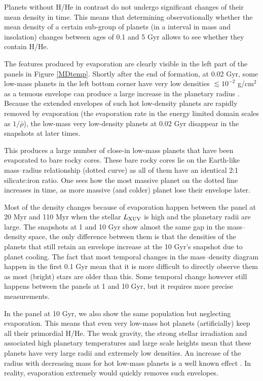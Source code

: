 \documentclass[]{emulateapj}
\begin{document}
Planets without H/He in contrast do not undergo significant changes of their mean density in time. This means that determining observationally whether the mean density of a certain sub-group of planets (in a interval in mass and insolation) changes between ages of 0.1 and 5 Gyr allows to see whether they contain H/He. 

The features produced by evaporation are clearly visible in the left part of the panels in Figure \ref{MDtemp}. Shortly after the end of formation, at 0.02 Gyr, some low-mass planets in the left bottom corner have very low densities $\lesssim10^{-2}$ g/cm$^{2}$ as a tenuous envelope can produce a large increase in the planetary radius \citep[e.g.,][]{Adams2008,Jin2014}. Because the extended envelopes of such hot low-density planets are rapidly removed by evaporation (the evaporation rate in the energy limited domain scales as $1/\bar{\rho}$), the low-mass very low-density planets at 0.02 Gyr disappear in the snapshots at later times.

This produces a large number of close-in low-mass planets that have been evaporated to bare rocky cores. These bare rocky cores lie on the Earth-like mass--radius relationship (dotted curve) as all of them have an identical 2:1 silicate:iron ratio. One sees how the most massive planet on the dotted line increases in time, as more massive (and colder) planet lose their envelope later. 
 
Most of the density changes because of evaporation happen between the panel at 20 Myr and 110 Myr when the stellar $L_{\rm XUV}$ is high and the planetary radii are large. The snapshots at 1 and 10 Gyr show almost the same gap in the mass--density space, the only difference between them is that the densities of the planets that still retain an envelope increase at the 10 Gyr's snapshot due to planet cooling. The fact that most temporal changes in the mass--density diagram happen in the first 0.1 Gyr mean that it is more difficult to directly observe them as most (bright) stars are older than this. Some temporal change however still happens between the panels at 1 and 10 Gyr, but it requires more precise measurements.

In the panel at 10 Gyr, we also show the same population but neglecting evaporation. This means that even very low-mass hot planets (artificially) keep all their primordial H/He. The weak gravity, the strong stellar irradiation and associated high planetary temperatures and large scale heights mean that these planets  have very large radii and extremely low densities. An increase of the radius with decreasing mass for hot low-mass planets is a well known effect \citep[e.g.,][]{Rogers2010density,Mordasini2012b}. In reality, evaporation extremely would quickly removes such envelopes.
\end{document}
